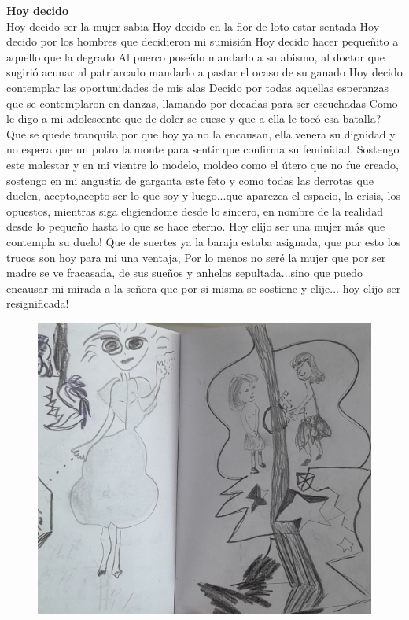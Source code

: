 \documentclass[12pt, a4paper, twoside]{book} %
\begin{document}
\noindent\textbf{Hoy decido}\\
Hoy decido ser la mujer sabia
Hoy decido en la flor de loto estar sentada
Hoy decido por los hombres que decidieron mi sumisión
Hoy decido hacer pequeñito a aquello que la degrado
Al puerco poseído mandarlo a su abismo, al doctor que sugirió acunar al patriarcado mandarlo a pastar el  ocaso de su ganado
Hoy decido contemplar las oportunidades de mis alas
Decido por todas aquellas esperanzas que se contemplaron en danzas, llamando por decadas para  ser escuchadas
Como le digo a mi adolescente que de doler se cuese y que a ella le tocó esa batalla?
Que se quede tranquila por que hoy ya no la encausan, ella venera su dignidad y no espera que un potro la monte para sentir que confirma su feminidad.
Sostengo este malestar y en mi vientre lo modelo, moldeo como el útero que no fue creado, sostengo en mi angustia de garganta este feto y  como todas las derrotas que duelen, acepto,acepto ser lo que soy  y luego...que aparezca el espacio, la crisis, los opuestos, mientras siga eligiendome desde lo sincero, en nombre de la realidad desde lo pequeño hasta lo que se hace eterno.
Hoy elijo ser una mujer más que contempla su duelo! Que de suertes ya la baraja estaba asignada, que por esto los trucos son hoy para mi una ventaja, Por lo menos no seré la mujer que por ser madre se ve fracasada,  de sus sueños y anhelos sepultada...sino que puedo encausar mi mirada a la señora que por si misma se sostiene y elije... hoy elijo  ser resignificada!

\begin{figure}[H]
	\centering
	\includegraphics[width=\textwidth]{./images/1f81324df24ae9.jpg}
\end{figure}
\end{document}
